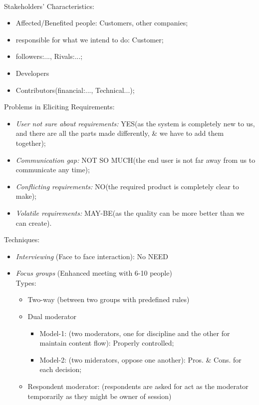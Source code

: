 \documentclass{article}
\begin{document}
\begin{enumerate}
\begin{itemize}
				\\Stakeholders' Characteristics:
				\begin{itemize}
					\item Affected/Benefited people: Customers, other companies;
					\item responsible for what we intend to do: Customer;	
					\item followers:..., Rivals:...;
					\item Developers
					\item Contributors(financial:..., Technical...);
				\end{itemize}
				Problems in Eliciting Requirements:
				\begin{itemize}
					\item \emph{User not sure about requirements:} YES(as the system is completely new to us, and there are all the parts made differently, \& we have to add them together);
					\item \emph{Communication gap:} NOT SO MUCH(the end user is not far away from us to communicate any time);
					\item \emph{Conflicting requirements:} NO(the required product is completely clear to make);
					\item \emph{Volatile requirements:} MAY-BE(as the quality can be more better than we can create).
				\end{itemize}
				Techniques:
				\begin{itemize}
					\item \emph{Interviewing} (Face to face interaction): No NEED
					\item \emph{Focus groups} (Enhanced meeting with 6-10 people)
					\\Types:
					\begin{itemize}
						\item Two-way (between two groups with predefined rules)
						\item Dual moderator
						\begin{itemize}
							\item Model-1: (two moderators, one for discipline and the other for maintain content flow): Properly controlled;
							\item Model-2: (two miderators, oppose one another): Pros. \& Cons. for each decision;
						\end{itemize}
						\item Respondent moderator: (respondents are asked for act as the moderator temporarily as they might be owner of session)

\end{itemize}
\end{itemize}
\end{itemize}
\end{enumerate}
\end{document}
